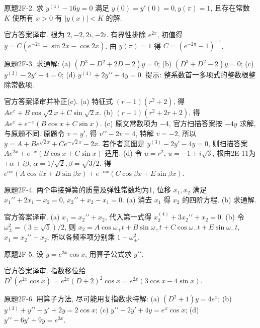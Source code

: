 \begin{exercise}\label{cw:bank-2F-2}
原题2F-2. 求 $y^{(4)}-16y=0$ 满足 $y(0)=y\prime(0)=0,y(\pi)=1$, 且存在常数 $K$ 使所有 $x>0$ 有 $|y(x)|<K$ 的解.
\end{exercise}
\begin{solution}
官方答案译审. 根为 $2,-2,2i,-2i$. 有界性排除 $e^{2x}$, 初值得 $y=C(e^{-2x}+\sin2x-\cos2x)$. 由 $y(\pi)=1$ 得 $C=(e^{-2\pi}-1)^{-1}$.
\end{solution}
\begin{exercise}\label{cw:bank-2F-3}
原题2F-3. 求通解: (a) $(D^3-D^2+2D-2)y=0$; (b) $(D^3+D^2-2)y=0$; (c) $y^{(3)}-2y\prime-4=0$; (d) $y^{(4)}+2y\prime\prime+4y=0$. 提示: 整系数首一多项式的整数根整除常数项.
\end{exercise}
\begin{solution}
官方答案译审并补正(c). (a) 特征式 $(r-1)(r^2+2)$, 得 $Ae^x+B\cos\sqrt2x+C\sin\sqrt2x$. (b) $(r-1)(r^2+2r+2)$, 得 $Ae^x+e^{-x}(B\cos x+C\sin x)$. (c) 原文常数项为 $-4$, 官方扫描答案按 $-4y$ 求解, 与原题不同. 原题令 $v=y\prime$, 得 $v\prime\prime-2v=4$, 特解 $v=-2$, 所以 $y=A+Be^{\sqrt2x}+Ce^{-\sqrt2x}-2x$. 若作者意图是 $y^{(3)}-2y\prime-4y=0$, 则扫描答案 $Ae^{2x}+e^{-x}(B\cos x+C\sin x)$ 适用. (d) 令 $u=r^2$, $u=-1\pm i\sqrt3$, 根由2E-11为 $\pm\alpha\pm i\beta$, $\alpha=1/\sqrt2,\beta=\sqrt{3/2}$. 得 $e^{\alpha x}(A\cos\beta x+B\sin\beta x)+e^{-\alpha x}(C\cos\beta x+E\sin\beta x)$.
\end{solution}
\begin{exercise}\label{cw:bank-2F-4}
原题2F-4. 两个串接弹簧的质量及弹性常数均为1, 位移 $x_1,x_2$ 满足 $x_1\prime\prime+2x_1-x_2=0$, $x_2\prime\prime+x_2-x_1=0$. (a) 消去 $x_1$ 得 $x_2$ 的四阶方程. (b) 求通解.
\end{exercise}
\begin{solution}
官方答案译审. (a) $x_1=x_2\prime\prime+x_2$, 代入第一式得 $x_2^{(4)}+3x_2\prime\prime+x_2=0$. (b) 令 $\omega_\pm^2=(3\pm\sqrt5)/2$, 则 $x_2=A\cos\omega_+t+B\sin\omega_+t+C\cos\omega_-t+E\sin\omega_-t$, $x_1=x_2\prime\prime+x_2$, 所以各频率项分别乘 $1-\omega_\pm^2$.
\end{solution}
\begin{exercise}\label{cw:bank-2F-5}
原题2F-5. 设 $y=e^{2x}\cos x$, 用算子公式求 $y\prime\prime$.
\end{exercise}
\begin{solution}
官方答案译审. 指数移位给 $D^2(e^{2x}\cos x)=e^{2x}(D+2)^2\cos x=e^{2x}(3\cos x-4\sin x)$.
\end{solution}
\begin{exercise}\label{cw:bank-2F-6}
原题2F-6. 用算子方法, 尽可能用复指数求特解: (a) $(D^2+1)y=4e^x$; (b) $y^{(3)}+y\prime\prime-y\prime+2y=2\cos x$; (c) $y\prime\prime-2y\prime+4y=e^x\cos x$; (d) $y\prime\prime-6y\prime+9y=e^{3x}$.
\end{exercise}
